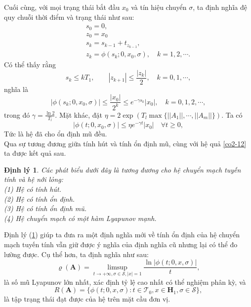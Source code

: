 \documentclass[14pt,a4paper,oneside]{report}		%
\newtheorem{theorem}{Định lý}[chapter]
\theoremstyle{definition}
\begin{document}
Cuối cùng, với mọi trạng thái bắt đầu $x_0$ và tín hiệu chuyển $\sigma$, ta định nghĩa đệ quy chuỗi thời điểm và trạng thái như sau:
\begin{equation}
\begin{split}
&\qquad s_0=0,\\
&\qquad z_0=x_0\\
&\qquad s_k=s_{k-1}+t_{z_{k-1}},\\
&\qquad z_k = \phi (s_k;0,x_0,\sigma),\quad k=1,2,\cdots.
\end{split}
\end{equation}
Có thể thấy rằng
\begin{equation} \label{eq2-26}
s_k \leq kT_1,\qquad |z_{k+1}|\leq \frac{|z_k|}{2}, \quad k=0,1,\cdots,
\end{equation}
nghĩa là 
$$|\phi(s_k;0,x_0,\sigma)|\leq\frac{|x_0|}{2^k}\leq e^{-\gamma s_k}|x_0|,\quad k=0,1,2,\cdots,$$
trong đó $\gamma = \frac{\ln 2}{T_l}$. Mặt khác, đặt $\eta = 2\exp(T_l\max\{||A_1||,\cdots,||A_m||\})$. Ta có
\begin{equation} \label{eq2-27}
|\phi (t;0,x_0,\sigma)|\leq \eta e^{-\gamma t}|x_0|\quad \forall t\geq 0,
\end{equation}
Tức là hệ đã cho ổn định mũ đều.\\

Qua sự tương đương giữa tính hút và tính ổn định mũ, cùng với hệ quả \ref{co2-12} ta được kết quả sau.

\begin{theorem}\label{the2-15}
Các phát biểu dưới đây là tương đương cho hệ chuyển mạch tuyến tính và hệ nới lỏng:\\
(1) Hệ có tính hút.\\
(2) Hệ có tính ổn định.\\
(3) Hệ có tính ổn định mũ.\\
(4) Hệ chuyển mạch có một hàm Lyapunov mạnh.
\end{theorem}
Định lý (\ref{the2-15}) giúp ta đưa ra một định nghĩa mới về tính ổn định của hệ chuyển mạch tuyến tính vẫn giữ được ý nghĩa của định nghĩa cũ nhưng lại có thể đo lường được. Cụ thể hơn, ta định nghĩa như sau:
\begin{equation}\label{eq2-28}
\varrho (\mathbf{A})=\limsup_{t\rightarrow +\infty,\sigma\in\mathcal{S},|x|=1}\frac{\ln|\phi(t;0,x,\sigma)|}{t},
\end{equation}
là số mũ Lyapunov lớn nhất, xác định tỷ lệ cao nhất có thể nghiệm phân kỳ, và
\begin{equation}\label{eq2-29}
R(\mathbf{A})=\{\phi (t;0,x,\sigma):t\in\mathcal{T}_0,x\in\mathbf{H}_1,\sigma\in\mathcal{S}\},
\end{equation}
là tập trạng thái đạt được của hệ trên mặt cầu đơn vị.
\end{document}
